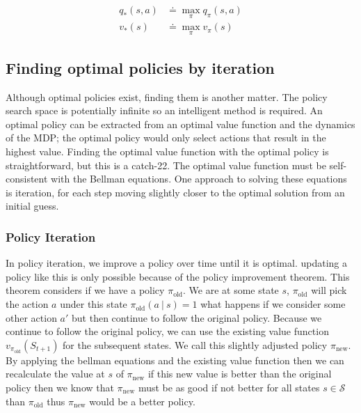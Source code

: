 \documentclass[]{final_report}
\begin{document}
\begin{align}
  q_\ast(s,a) & \doteq \max_\pi q_\pi(s,a)\label{eqn:q-optimal-def} \\
  v_\ast(s)   & \doteq \max_\pi v_\pi(s) \label{eqn:v-optimal-def}
\end{align}




\subsection{Finding optimal policies by iteration}\label{iteration-approaches}

Although optimal policies exist, finding them is another matter. The policy search space is potentially infinite so an intelligent method is required. An optimal policy can be extracted from an optimal value function and the dynamics of the MDP; the optimal policy would only select actions that result in the highest value. Finding the optimal value function with the optimal policy is straightforward, but this is a catch-22. The optimal value function must be self-consistent with the Bellman equations. One approach to solving these equations is iteration, for each step moving slightly closer to the optimal solution from an initial guess. 

\subsubsection{Policy Iteration}

In policy iteration, we improve a policy over time until it is optimal. updating a policy like this is only possible because of the policy improvement theorem. This theorem considers if we have a policy $\pi_{\text{old}}$. We are at some state $s$, $\pi_{\text{old}}$ will pick the action $a$ under this state $\pi_{\text{old}}(a\ |\ s) = 1$ what happens if we consider some other action $a'$ but then continue to follow the original policy. Because we continue to follow the original policy, we can use the existing value function $v_{\pi_{\text{old}}}(S_{t+1})$ for the subsequent states. We call this slightly adjusted policy $\pi_{\text{new}}$. By applying the bellman equations and the existing value function then we can recalculate the value at $s$ of $\pi_{\text{new}}$ if this new value is better than the original policy then we know that $\pi_{\text{new}}$ must be as good if not better for all states $s \in \mathcal{S}$ than $\pi_{\text{old}}$ thus $\pi_{\text{new}}$ would be a better policy. 
\end{document}
